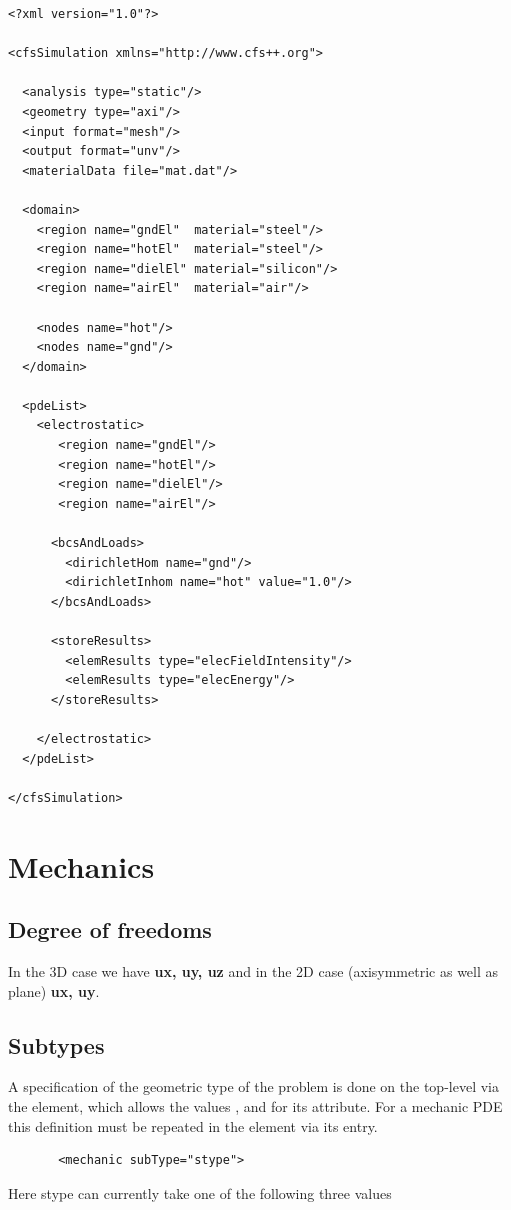 {\footnotesize
\begin{verbatim}
<?xml version="1.0"?>

<cfsSimulation xmlns="http://www.cfs++.org">

  <analysis type="static"/>
  <geometry type="axi"/>
  <input format="mesh"/>
  <output format="unv"/>
  <materialData file="mat.dat"/>

  <domain>
    <region name="gndEl"  material="steel"/>
    <region name="hotEl"  material="steel"/>
    <region name="dielEl" material="silicon"/>
    <region name="airEl"  material="air"/>

    <nodes name="hot"/>
    <nodes name="gnd"/>
  </domain>

  <pdeList>
    <electrostatic>
       <region name="gndEl"/>
       <region name="hotEl"/>
       <region name="dielEl"/>
       <region name="airEl"/>

      <bcsAndLoads>
        <dirichletHom name="gnd"/>
        <dirichletInhom name="hot" value="1.0"/>
      </bcsAndLoads>

      <storeResults>
        <elemResults type="elecFieldIntensity"/>
        <elemResults type="elecEnergy"/>
      </storeResults>

    </electrostatic>
  </pdeList>

</cfsSimulation>
\end{verbatim}
}


\newpage
\section{Mechanics}
\subsection{Degree of freedoms}
In the 3D case we have {\bf ux, uy, uz} and in the 2D case
(axisymmetric as well as plane) {\bf ux, uy}.


\subsection{Subtypes}

A specification of the geometric type of the problem is done on the top-level
via the  element, which allows the values , 
and  for its  attribute. For a mechanic PDE this definition
must be repeated in the  element via its  entry.
\begin{verbatim}
       <mechanic subType="stype">
\end{verbatim}
\noindent Here stype can currently take one of the following three values

